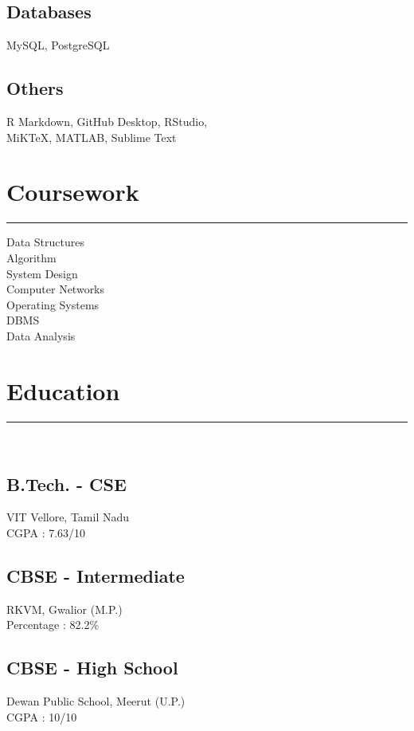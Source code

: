 \documentclass[]{meetresume-class}
\begin{document}
\begin{minipage}[t]{0.33\textwidth}
		\subsection{Databases}
		MySQL, PostgreSQL
		\vspace{6pt}
		
		\subsection{Others}
		R Markdown, GitHub Desktop, RStudio,\\
		MiKTeX, MATLAB, Sublime Text
		\sectionsep
		\section{Coursework}
		\noindent\rule{5cm}{0.6pt}
		
		Data Structures\\
		Algorithm\\
		System Design\\
		Computer Networks\\
		Operating Systems\\
		DBMS\\
		Data Analysis
		\sectionsep
		\section{Education} 
		\noindent\rule{5cm}{0.6pt}\\
		\subsection{B.Tech. - CSE}
		VIT Vellore, Tamil Nadu \\
		CGPA : 7.63/10\\
		\vspace{8pt}
		\subsection{CBSE - Intermediate}
		RKVM, Gwalior (M.P.)\\
		Percentage : 82.2\%\\
		\vspace{8pt}
		\subsection{CBSE - High School}
		Dewan Public School, Meerut (U.P.)\\
		CGPA : 10/10
		\sectionsep

\end{minipage}
\end{document}
